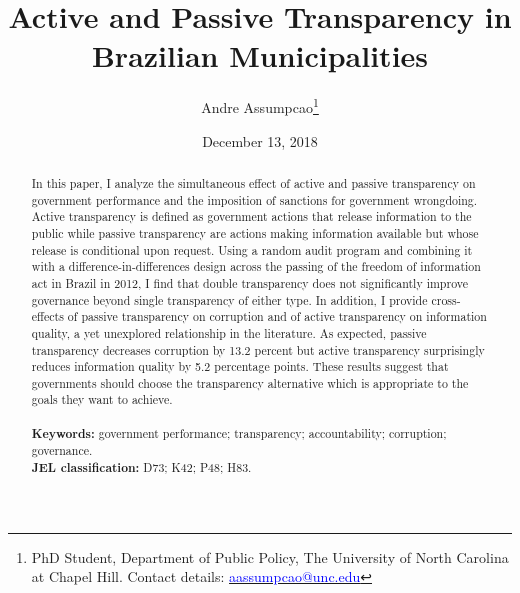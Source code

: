 \documentclass[11pt]{article}
\begin{document}
\begin{titlepage}
\title{Active and Passive Transparency in Brazilian Municipalities}
\author{Andre Assumpcao\thanks{PhD Student, Department of Public Policy, The University of North Carolina at Chapel Hill. Contact details: \href{mailto:aassumpcao@unc.edu}{\textcolor{blue}{aassumpcao@unc.edu}}}}
\date{December 13, 2018}

\maketitle

\begin{abstract}
\noindent In this paper, I analyze the simultaneous effect of active and passive transparency on government performance and the imposition of sanctions for government wrongdoing. Active transparency is defined as government actions that release information to the public while passive transparency are actions making information available but whose release is conditional upon request. Using a random audit program and combining it with a difference-in-differences design across the passing of the freedom of information act in Brazil in 2012, I find that double transparency does not significantly improve governance beyond single transparency of either type. In addition, I provide cross-effects of passive transparency on corruption and of active transparency on information quality, a yet unexplored relationship in the literature. As expected, passive transparency decreases corruption by 13.2 percent but active transparency surprisingly reduces information quality by 5.2 percentage points. These results suggest that governments should choose the transparency alternative which is appropriate to the goals they want to achieve. \\
\vspace{0in} \\
\noindent\textbf{Keywords:} government performance; transparency; accountability; corruption; governance. \\

\noindent\textbf{JEL classification:} D73; K42; P48; H83. \\

\vspace{0in}
\bigskip

\end{abstract}

\setcounter{page}{0}

\thispagestyle{empty}

\end{titlepage}
\end{document}
